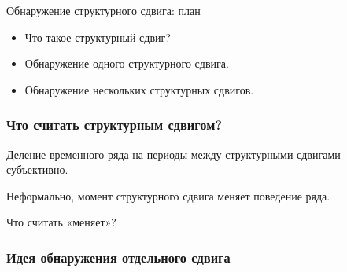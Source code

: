 
\begin{frame} %


\end{frame}



\begin{frame}{Обнаружение структурного сдвига: план}
  \begin{itemize}[<+->]
    \item Что такое структурный сдвиг? 
    \item Обнаружение одного структурного сдвига. 
    \item Обнаружение нескольких структурных сдвигов. 
  \end{itemize}

\end{frame}

\begin{frame}
  \frametitle{Что считать структурным сдвигом?}

  \pause 
  Деление временного ряда на периоды между структурными сдвигами \alert{субъективно}.

  \pause
  Неформально, момент структурного сдвига \alert{меняет} поведение ряда. 

  \pause
  Что считать «меняет»?

\end{frame}


\begin{frame}
  \frametitle{Идея обнаружения отдельного сдвига}

  \begin{itemize}
    
\end{itemize}

\end{frame}


